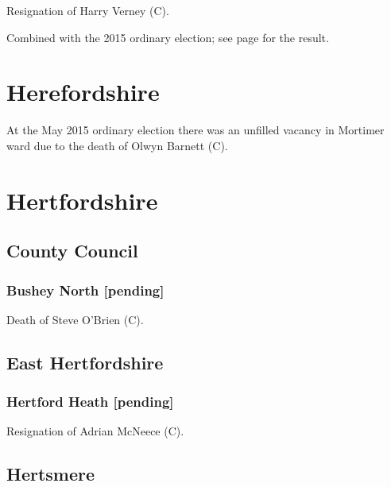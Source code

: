 \documentclass[a4paper,openany]{book}
\begin{document}
\begin{resultsiii}
Resignation of Harry Verney (C).

Combined with the 2015 ordinary election; see page \pageref{CheritonBishopsSuttonWinchester} for the result.

\section{Herefordshire}

\noindent
At the May 2015 ordinary election there was an unfilled vacancy in Mortimer ward due to the death of Olwyn Barnett (C).

\section{Hertfordshire}

\subsection*{County Council}

\subsubsection*{Bushey North \hspace*{\fill}\nolinebreak[1]%
\enspace\hspace*{\fill}
[pending]}


Death of Steve O'Brien (C).

\subsection*{East Hertfordshire}

\subsubsection*{Hertford Heath \hspace*{\fill}\nolinebreak[1]%
\enspace\hspace*{\fill}
[pending]}


Resignation of Adrian McNeece (C).

\subsection*{Hertsmere}


\end{resultsiii}
\end{document}
